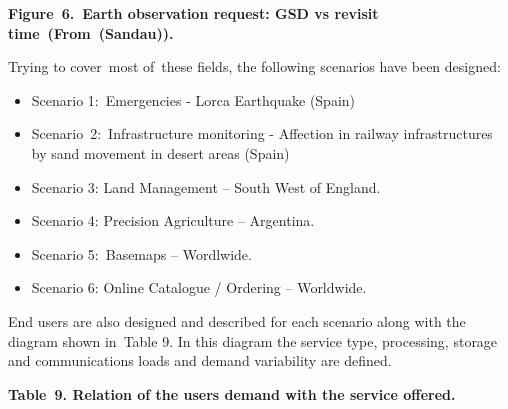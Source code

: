 \documentclass[a4paper]{article}
\newcommand\liststyleLFOxi{%
\renewcommand\labelitemi{[F0B7?]}
\renewcommand\labelitemii{o}
\renewcommand\labelitemiii{[F0A7?]}
\renewcommand\labelitemiv{[F0B7?]}
}
\begin{document}
{\centering\bfseries
\label{bkm:Ref377564518}Figure\ 6.\ Earth observation request: GSD vs
revisit time\ (From\ (Sandau)).
\par}


\bigskip

Trying to cover\ most of\ these fields, the following scenarios have
been designed:


\bigskip

\liststyleLFOxi
\begin{itemize}
\item Scenario 1:\ \foreignlanguage{english}{Emergencies - Lorca
Earthquake (Spain)}
\item Scenario\ 2:\ \foreignlanguage{english}{Infrastructure monitoring
- Affection in railway infrastructures by sand movement in desert areas
(Spain)}
\item Scenario 3: Land Management -- South West of England.
\item Scenario 4: Precision Agriculture -- Argentina.
\item Scenario 5:\ Basemaps -- Wordlwide.
\item Scenario 6: Online Catalogue / Ordering -- Worldwide.
\end{itemize}
End users are also designed and described for each scenario along with
the diagram shown in\ Table 9. In this diagram the service type,
processing, storage and communications loads and demand variability are
defined.

\clearpage
\bigskip


\bigskip

{\centering\bfseries
\label{bkm:Ref377566016}Table\ 9. Relation of the users demand with the
service offered.
\par}
\end{document}
